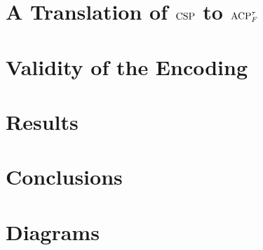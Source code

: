 \documentclass[logo,bsc,singlespacing,parskip,online]{infthesis}
\begin{document}
\chapter{A Translation of \texorpdfstring{$\mathrm{CSP}$}{CSP} to \texorpdfstring{$\mathrm{ACP}_{F}^{\tau}$}{ACP}}



\newpage
\chapter{Validity of the Encoding}


\chapter{Results}


\chapter{Conclusions}







\appendix

\chapter{Diagrams}
\end{document}
